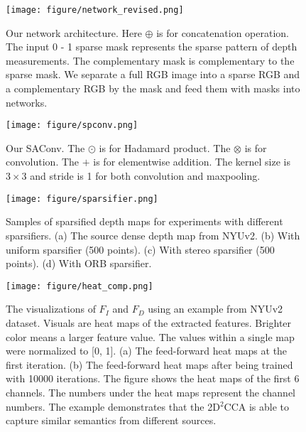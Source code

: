 \documentclass{article}
\begin{document}
\begin{figure}[bt!]
    \centering
    \texttt{[image: figure/network\_revised.png]}
    \caption{Our network architecture. Here $\oplus$ is for concatenation operation. The input 0 - 1 sparse mask represents the sparse pattern of depth measurements. The complementary mask is complementary to the sparse mask. We separate a full RGB image into a sparse RGB and a complementary RGB by the mask and feed them with masks into networks.}
    \label{fig:network}
\end{figure}

\begin{figure}[tbp]
\centering
\begin{minipage}[t]{0.4\textwidth}
    \centering
    \texttt{[image: figure/spconv.png]}
    \caption{Our SAConv. The $\odot$ is for Hadamard product. The $\otimes$ is for convolution. The $+$ is for elementwise addition. The kernel size is $3\times3$ and stride is 1 for both convolution and maxpooling.}
    \label{fig:spconv}
\end{minipage}
\hspace{0.5cm}
\begin{minipage}[t]{0.5\textwidth}
      \centering
    \texttt{[image: figure/sparsifier.png]}
    \caption{Samples of sparsified depth maps for experiments with different sparsifiers. (a) The source dense depth map from NYUv2. (b) With uniform sparsifier (500 points). (c) With stereo sparsifier (500 points). (d) With ORB sparsifier. }
    \label{fig:sparsifier_sample}
\end{minipage}
\end{figure}

\begin{figure}[hbt!]
    \centering
    \texttt{[image: figure/heat\_comp.png]}
    \caption{The visualizations of $\mathit{F_{I}}$ and $\mathit{F_{D}}$ using an example from NYUv2 dataset. Visuals are heat maps of the extracted features. Brighter color means a larger feature value. The values within a single map were normalized to [0, 1]. (a) The feed-forward heat maps at the first iteration. (b) The feed-forward heat maps after being trained with 10000 iterations. The figure shows the heat maps of the first 6 channels. The numbers under the heat maps represent the channel numbers. The example demonstrates that the 2D$^2$CCA is able to capture similar semantics from different sources.}
    \label{fig:heat_comp}
\end{figure}
\end{document}
